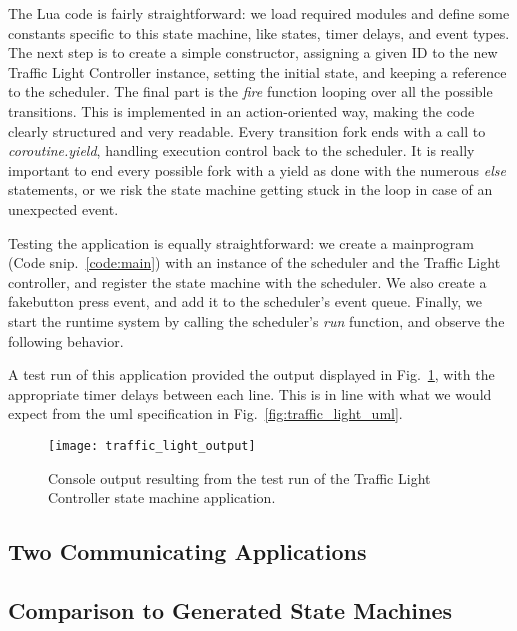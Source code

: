 The Lua code is fairly straightforward: we load required modules and define some constants specific to this state machine, like states, timer delays, and event types. The next step is to create a simple constructor, assigning a given ID to the new Traffic Light Controller instance, setting the initial state, and keeping a reference to the scheduler. The final part is the \emph{fire} function looping over all the possible transitions. This is implemented in an action-oriented way, making the code clearly structured and very readable. Every transition fork ends with a call to \emph{coroutine.yield}, handling execution control back to the scheduler. It is really important to end every possible fork with a yield as done with the numerous \emph{else} statements, or we risk the state machine getting stuck in the loop in case of an unexpected event.

Testing the application is equally straightforward: we create a \guillemotleft main\guillemotright  program (Code snip.~\ref{code:main}) with an instance of the scheduler and the Traffic Light controller, and register the state machine with the scheduler. We also create a \guillemotleft fake\guillemotright  button press event, and add it to the scheduler's event queue. Finally, we start the runtime system by calling the scheduler's \emph{run} function, and observe the following behavior.

A test run of this application provided the output displayed in Fig.~\ref{fig:traffic_light_output}, with the appropriate timer delays between each line. This is in line with what we would expect from the \gls{uml} specification in Fig.~\ref{fig:traffic_light_uml}.

\begin{figure}[H]
	\centering
	\texttt{[image: traffic\_light\_output]}
	\caption[Output of Traffic Light Controller test run]{Console output resulting from the test run of the Traffic Light Controller state machine application.}
	\label{fig:traffic_light_output}
\end{figure}

\subsection{Two Communicating Applications}


\subsection{Comparison to Generated State Machines}


